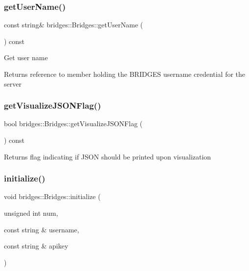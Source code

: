 \subsubsection{\texorpdfstring{get\+User\+Name()}{getUserName()}}
{\footnotesize\ttfamily const string\& bridges\+::\+Bridges\+::get\+User\+Name (\begin{DoxyParamCaption}{ }\end{DoxyParamCaption}) const\hspace{0.3cm}{\ttfamily [inline]}}

Get user name \begin{DoxyReturn}{Returns}
reference to member holding the B\+R\+I\+D\+G\+ES username credential for the server 
\end{DoxyReturn}
\mbox{\label{classbridges_1_1_bridges_a6c2897b19a25989e09c031152a74317d}} 
\subsubsection{\texorpdfstring{get\+Visualize\+J\+S\+O\+N\+Flag()}{getVisualizeJSONFlag()}}
{\footnotesize\ttfamily bool bridges\+::\+Bridges\+::get\+Visualize\+J\+S\+O\+N\+Flag (\begin{DoxyParamCaption}{ }\end{DoxyParamCaption}) const\hspace{0.3cm}{\ttfamily [inline]}}

\begin{DoxyReturn}{Returns}
flag indicating if J\+S\+ON should be printed upon visualization 
\end{DoxyReturn}
\mbox{\label{classbridges_1_1_bridges_a507ee9983331d23829cfc60fd13ead78}} 
\subsubsection{\texorpdfstring{initialize()}{initialize()}}
{\footnotesize\ttfamily void bridges\+::\+Bridges\+::initialize (\begin{DoxyParamCaption}\item[{unsigned int}]{num,  }\item[{const string \&}]{username,  }\item[{const string \&}]{apikey }\end{DoxyParamCaption})\hspace{0.3cm}{\ttfamily [inline]}}



